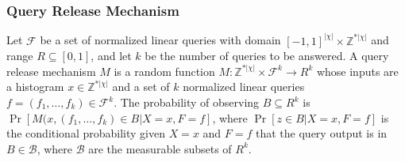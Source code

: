 \begin{frame}[allowframebreaks]%
\frametitle{Query Release Mechanism}
\begin{definition}
\label{def:query_mechanism} Let $\mathcal{F}$ be a set of normalized linear
queries with domain $[-1,1]^{|\chi |}\times \mathbb{Z}^{\ast |\chi |}$ and
range $R\subseteq \left[ 0,1\right] $, and let $k$ be the number of queries
to be answered. A query release mechanism $M$ is a random function $M:%
\mathbb{Z}^{\ast |\chi |}\times \mathcal{F}^{k}\rightarrow R^{k}$ whose
inputs are a histogram $x\in \mathbb{Z}^{\ast |\chi |}$ and a set of $k$
normalized linear queries $f=(f_{1},\ldots ,f_{k})\in \mathcal{F}^{k}$. The
probability of observing $B\subseteq R^{k}$ is $\Pr \left[ M(x,(f_{1},\ldots
,f_{k})\in B|X=x,F=f\right] $, where $\Pr \left[ z\in B|X=x,F=f\right] $ is
the conditional probability given $X=x$ and $F=f$ that the query output is
in $B\in \mathcal{B}$, where $\mathcal{B}$ are the measurable subsets of $%
R^{k}$.
\end{definition}


\end{frame}%
%



